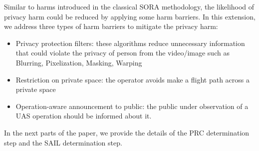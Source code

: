 \documentclass[a4paper, 10, conference]{ieeeconf}  %
\begin{document}
Similar to harms introduced in the classical SORA methodology, the likelihood of privacy harm could be reduced by applying some harm barriers. In this extension, we address three types of harm barriers to mitigate the privacy harm: 

\begin{itemize}
    \item Privacy protection filters: these algorithms reduce unnecessary information that could violate the privacy of person from the video/image such as Blurring, Pixelization, Masking, Warping \cite{7285023}  
    \item Restriction on private space: the operator avoids make a flight path across a private space \cite{8328983}
    \item Operation-aware announcement to public: the public under observation of a UAS operation should be informed about it.
\end{itemize}

In the next parts of the paper, we provide the details of the  PRC determination step and the SAIL determination step.
\end{document}
